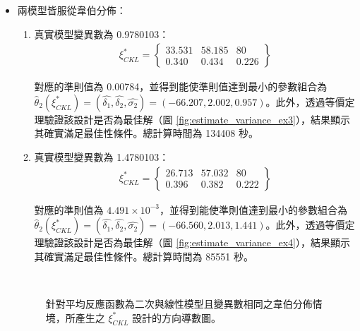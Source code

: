 \begin{itemize}
\item 兩模型皆服從韋伯分佈：

\begin{enumerate}

\item 真實模型變異數為 0.9780103：
\begin{align*}
\xi^*_{CKL} = \left\{\begin{array}{ccc}
33.531 & 58.185 & 80 \\
0.340 & 0.434 & 0.226
\end{array}\right\}
\end{align*}

對應的準則值為 0.00784，並得到能使準則值達到最小的參數組合為 $\hat{\theta}_2(\xi^*_{CKL})=(\hat{\delta_1},\hat{\delta_2},\hat{\sigma_2})=(-66.207, 2.002, 0.957)$。此外，透過等價定理驗證該設計是否為最佳解（圖 \ref{fig:estimate_variance_ex3}），結果顯示其確實滿足最佳性條件。總計算時間為 134408 秒。

\item 真實模型變異數為 1.4780103：
\begin{align*}
\xi^*_{CKL} = \left\{\begin{array}{ccc}
26.713 & 57.032 & 80 \\
0.396 & 0.382 & 0.222
\end{array}\right\}
\end{align*}

對應的準則值為 $4.491\times 10^{-3}$，並得到能使準則值達到最小的參數組合為 $\hat{\theta}_2(\xi^*_{CKL})=(\hat{\delta_1},\hat{\delta_2},\hat{\sigma_2})=(-66.560, 2.013, 1.441)$。此外，透過等價定理驗證該設計是否為最佳解（圖 \ref{fig:estimate_variance_ex4}），結果顯示其確實滿足最佳性條件。總計算時間為 85551 秒。

\end{enumerate}

\begin{figure}[H]
\centering
{}
 \\
\caption{針對平均反應函數為二次與線性模型且變異數相同之韋伯分佈情境，所產生之 $\xi^*_{CKL}$ 設計的方向導數圖。}
\label{fig:DeviceA_estimate_variance_weibull}
\end{figure}

\end{itemize}

